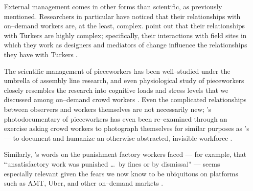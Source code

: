 \documentclass{sigchi}
\begin{document}
External management comes in other forms than scientific, as previously mentioned.
Researchers in particular have noticed that their relationships with on--demand workers are,
at the least, complex.
\citeauthor{storiesIraniSilberman} point out that their relationships with Turkers are highly complex;
specifically, their interactions with field sites in which they work
as designers and mediators of change influence the relationships they have with Turkers
\cite{storiesIraniSilberman}.

The scientific management of pieceworkers has been well--studied under the umbrella of assembly line research,
and even physiological study of pieceworkers closely resembles the
research into cognitive loads and stress levels that we discussed among on--demand crowd workers
\cite{pieceworkBiologicalHarm,hu1961parallel}.
Even the complicated relationships between observers and workers themselves are not necessarily new;
\citeauthor{riisOtherSideLives}'s photodocumentary of pieceworkers has even been re--examined through an exercise asking crowd workers
to photograph themselves for similar purposes as \citeauthor{riisOtherSideLives}'s --- to document and humanize an otherwise abstracted, invisible workforce
\cite{facesOfMechanicalTurk,turkopticon,riisOtherSideLives}.

Similarly, \citeauthor{pollard1963factory}'s words on the punishment factory workers faced ---
for example, that ``unsatisfactory work was punished \dots~by fines or by dismissal'' ---
seems especially relevant given the fears we now know to be ubiquitous on platforms such as AMT, Uber, and other on--demand markets
\cite{pollard1963factory,uberAlgorithm,dynamo,turkopticon,takingAHITMcInnis}.





\end{document}

